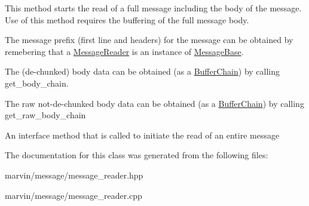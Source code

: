 This method starts the read of a full message including the body of the message. Use of this method requires the buffering of the full message body.

The message prefix (first line and headers) for the message can be obtained by remebering that a \hyperlink{class_message_reader}{Message\+Reader} is an instance of \hyperlink{class_message_base}{Message\+Base}.

The (de-\/chunked) body data can be obtained (as a \hyperlink{class_buffer_chain}{Buffer\+Chain}) by calling get\+\_\+body\+\_\+chain.

The raw not-\/de-\/chunked body data can be obtained (as a \hyperlink{class_buffer_chain}{Buffer\+Chain}) by calling get\+\_\+raw\+\_\+body\+\_\+chain

An interface method that is called to initiate the read of an entire message 

The documentation for this class was generated from the following files\+:\begin{DoxyCompactItemize}
\item 
marvin/message/message\+\_\+reader.\+hpp\item 
marvin/message/message\+\_\+reader.\+cpp\end{DoxyCompactItemize}
